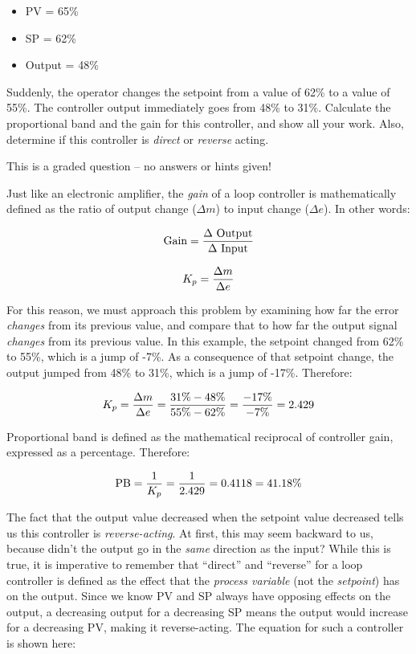 \begin{itemize}
\item{} PV = 65\%
\item{} SP = 62\%
\item{} Output = 48\%
\end{itemize}

Suddenly, the operator changes the setpoint from a value of 62\% to a value of 55\%.  The controller output immediately goes from 48\% to 31\%.  Calculate the proportional band and the gain for this controller, and show all your work.  Also, determine if this controller is {\it direct} or {\it reverse} acting.

\vfil

\eject






This is a graded question -- no answers or hints given!







Just like an electronic amplifier, the {\it gain} of a loop controller is mathematically defined as the ratio of output change ($\Delta m$) to input change ($\Delta e$).  In other words:

$$\hbox{Gain} = {\Delta \hbox{ Output} \over \Delta \hbox{ Input}}$$

$$K_p = {\Delta m \over \Delta e}$$

For this reason, we must approach this problem by examining how far the error {\it changes} from its previous value, and compare that to how far the output signal {\it changes} from its previous value.  In this example, the setpoint changed from 62\% to 55\%, which is a jump of -7\%.  As a consequence of that setpoint change, the output jumped from 48\% to 31\%, which is a jump of -17\%.  Therefore:

$$K_p = {\Delta m \over \Delta e} = {31\% - 48\% \over 55\% - 62\%} = {-17\% \over -7\%} = 2.429$$

Proportional band is defined as the mathematical reciprocal of controller gain, expressed as a percentage.  Therefore:

$$\hbox{PB} = {1 \over K_p} = {1 \over 2.429} = 0.4118 = 41.18\%$$

\vskip 10pt

The fact that the output value decreased when the setpoint value decreased tells us this controller is {\it reverse-acting}.  At first, this may seem backward to us, because didn't the output go in the {\it same} direction as the input?  While this is true, it is imperative to remember that ``direct'' and ``reverse'' for a loop controller is defined as the effect that the {\it process variable} (not the {\it setpoint}) has on the output.  Since we know PV and SP always have opposing effects on the output, a decreasing output for a decreasing SP means the output would increase for a decreasing PV, making it reverse-acting.  The equation for such a controller is shown here:

